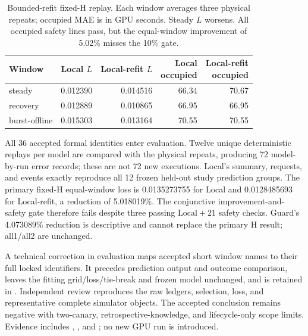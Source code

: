 \begin{table}[t]
\centering
\small
\caption{Bounded-refit fixed-H replay. Each window averages three physical repeats;
occupied MAE is in GPU seconds. Steady $L$ worsens. All occupied safety lines
pass, but the equal-window improvement of 5.02\% misses the 10\% gate.}
\label{tab:w3model}
\setlength{\tabcolsep}{2pt}
\par\vspace{4pt}
\begin{tabular*}{\linewidth}{@{\extracolsep{\fill}}lrrrr@{}}
\toprule
Window & Local $L$ & \shortstack{Local-refit\\$L$} & \shortstack{Local\\occupied} & \shortstack{Local-refit\\occupied}\\
\midrule
steady & 0.012390 & 0.014516 & 66.34 & 70.67\\
recovery & 0.012889 & 0.010865 & 66.95 & 66.95\\
burst-offline & 0.015303 & 0.013164 & 70.55 & 70.55\\
\bottomrule
\end{tabular*}
\end{table}

All 36 accepted formal identities enter evaluation. Twelve unique deterministic
replays per model are compared with the physical repeats, producing 72
model-by-run error records; these are not 72 new executions. Local's summary,
requests, and events exactly reproduce all 12 frozen held-out study prediction groups.
The primary fixed-H equal-window loss is 0.0135273755 for Local and 0.0128485693
for Local-refit, a reduction of 5.018019\%. The conjunctive improvement-and-safety
gate therefore fails despite three passing $\text{Local}+21$ safety checks. Guard's
4.073089\% reduction is descriptive and cannot replace the primary H result;
all1/all2 are unchanged.

A technical correction in evaluation maps accepted short window names to
their full locked identifiers. It precedes prediction output and outcome
comparison, leaves the fitting grid/loss/tie-break and frozen model unchanged,
and is retained in . Independent
review reproduces the raw ledgers, selection, loss, and representative complete
simulator objects. The accepted conclusion remains negative with two-canary,
retrospective-knowledge, and lifecycle-only scope limits. Evidence includes
, , and
; no new GPU run is introduced.
